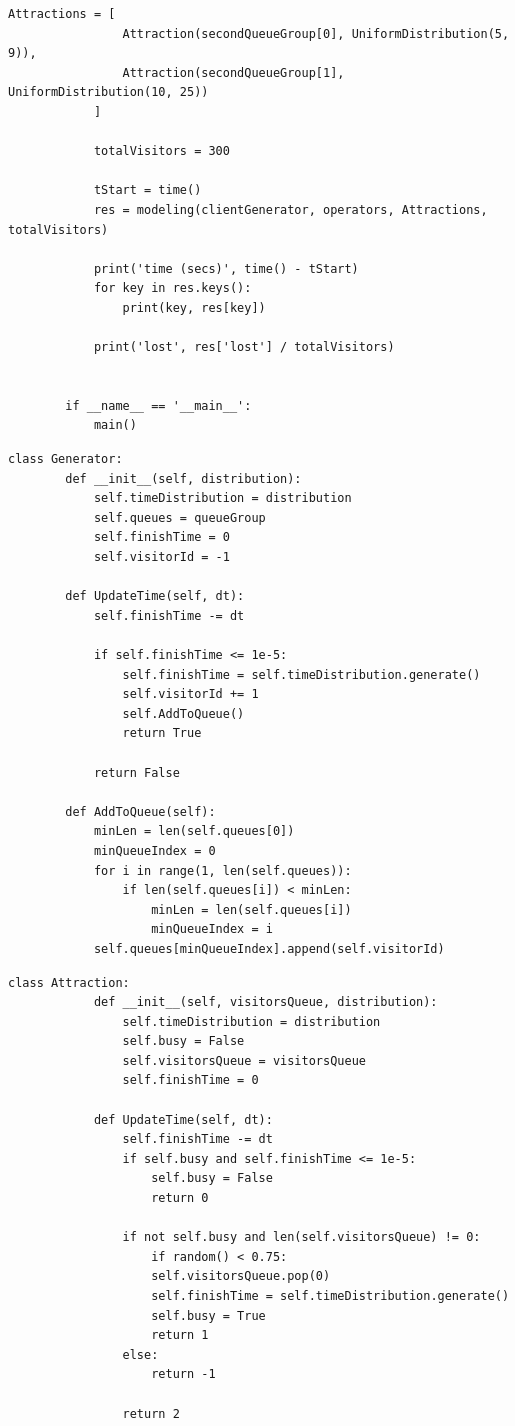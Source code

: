 \documentclass[14pt, a4paper]{extarticle}
\begin{document}
\begin{lstlisting}[caption=main.py]
			Attractions = [
				Attraction(secondQueueGroup[0], UniformDistribution(5, 9)),   
				Attraction(secondQueueGroup[1], UniformDistribution(10, 25))   
			]
			
			totalVisitors = 300
			
			tStart = time()
			res = modeling(clientGenerator, operators, Attractions, totalVisitors)
			
			print('time (secs)', time() - tStart)
			for key in res.keys():
				print(key, res[key])
			
			print('lost', res['lost'] / totalVisitors)
			
		
		if __name__ == '__main__':
			main()		
	\end{lstlisting}

	\begin{lstlisting}[caption=Generator.py]
	class Generator:
		def __init__(self, distribution):
			self.timeDistribution = distribution
			self.queues = queueGroup
			self.finishTime = 0
			self.visitorId = -1
		
		def UpdateTime(self, dt):
			self.finishTime -= dt
		
			if self.finishTime <= 1e-5:
				self.finishTime = self.timeDistribution.generate()
				self.visitorId += 1
				self.AddToQueue()
				return True
		
			return False
		
		def AddToQueue(self):
			minLen = len(self.queues[0])
			minQueueIndex = 0
			for i in range(1, len(self.queues)):
				if len(self.queues[i]) < minLen:
					minLen = len(self.queues[i])
					minQueueIndex = i
			self.queues[minQueueIndex].append(self.visitorId)	
	\end{lstlisting}
	
	\begin{lstlisting}[caption=Attraction.py]
		class Attraction:
			def __init__(self, visitorsQueue, distribution):
				self.timeDistribution = distribution
				self.busy = False
				self.visitorsQueue = visitorsQueue
				self.finishTime = 0
		
			def UpdateTime(self, dt):
				self.finishTime -= dt
				if self.busy and self.finishTime <= 1e-5:
					self.busy = False
					return 0
				
				if not self.busy and len(self.visitorsQueue) != 0:
					if random() < 0.75:
					self.visitorsQueue.pop(0)
					self.finishTime = self.timeDistribution.generate()
					self.busy = True
					return 1
				else:
					return -1
				
				return 2
	\end{lstlisting}	
\end{document}
